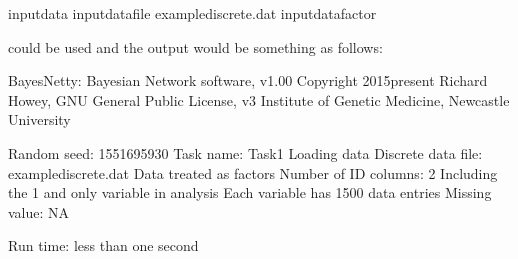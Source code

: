 \documentclass[letterpaper,10pt,english]{sphinxmanual}
\begin{document}
\begin{sphinxVerbatim}[commandchars=\\\{\}]
\PYGZhy{}input\PYGZhy{}data
\PYGZhy{}input\PYGZhy{}data\PYGZhy{}file example\PYGZhy{}discrete.dat
\PYGZhy{}input\PYGZhy{}data\PYGZhy{}factor
\end{sphinxVerbatim}

\sphinxAtStartPar
could be used and the output would be something as follows:

\begin{sphinxVerbatim}[commandchars=\\\{\}]
BayesNetty: Bayesian Network software, v1.00
\PYGZhy{}\PYGZhy{}\PYGZhy{}\PYGZhy{}\PYGZhy{}\PYGZhy{}\PYGZhy{}\PYGZhy{}\PYGZhy{}\PYGZhy{}\PYGZhy{}\PYGZhy{}\PYGZhy{}\PYGZhy{}\PYGZhy{}\PYGZhy{}\PYGZhy{}\PYGZhy{}\PYGZhy{}\PYGZhy{}\PYGZhy{}\PYGZhy{}\PYGZhy{}\PYGZhy{}\PYGZhy{}\PYGZhy{}\PYGZhy{}\PYGZhy{}\PYGZhy{}\PYGZhy{}\PYGZhy{}\PYGZhy{}\PYGZhy{}\PYGZhy{}\PYGZhy{}\PYGZhy{}\PYGZhy{}\PYGZhy{}\PYGZhy{}\PYGZhy{}\PYGZhy{}\PYGZhy{}\PYGZhy{}\PYGZhy{}\PYGZhy{}\PYGZhy{}\PYGZhy{}\PYGZhy{}\PYGZhy{}\PYGZhy{}
Copyright 2015\PYGZhy{}present Richard Howey, GNU General Public License, v3
Institute of Genetic Medicine, Newcastle University

Random seed: 1551695930
\PYGZhy{}\PYGZhy{}\PYGZhy{}\PYGZhy{}\PYGZhy{}\PYGZhy{}\PYGZhy{}\PYGZhy{}\PYGZhy{}\PYGZhy{}\PYGZhy{}\PYGZhy{}\PYGZhy{}\PYGZhy{}\PYGZhy{}\PYGZhy{}\PYGZhy{}\PYGZhy{}\PYGZhy{}\PYGZhy{}\PYGZhy{}\PYGZhy{}\PYGZhy{}\PYGZhy{}\PYGZhy{}\PYGZhy{}\PYGZhy{}\PYGZhy{}\PYGZhy{}\PYGZhy{}\PYGZhy{}\PYGZhy{}\PYGZhy{}\PYGZhy{}\PYGZhy{}\PYGZhy{}\PYGZhy{}\PYGZhy{}\PYGZhy{}\PYGZhy{}\PYGZhy{}\PYGZhy{}\PYGZhy{}\PYGZhy{}\PYGZhy{}\PYGZhy{}\PYGZhy{}\PYGZhy{}\PYGZhy{}\PYGZhy{}
Task name: Task\PYGZhy{}1
Loading data
Discrete data file: example\PYGZhy{}discrete.dat
Data treated as factors
Number of ID columns: 2
Including the 1 and only variable in analysis
Each variable has 1500 data entries
Missing value: NA
\PYGZhy{}\PYGZhy{}\PYGZhy{}\PYGZhy{}\PYGZhy{}\PYGZhy{}\PYGZhy{}\PYGZhy{}\PYGZhy{}\PYGZhy{}\PYGZhy{}\PYGZhy{}\PYGZhy{}\PYGZhy{}\PYGZhy{}\PYGZhy{}\PYGZhy{}\PYGZhy{}\PYGZhy{}\PYGZhy{}\PYGZhy{}\PYGZhy{}\PYGZhy{}\PYGZhy{}\PYGZhy{}\PYGZhy{}\PYGZhy{}\PYGZhy{}\PYGZhy{}\PYGZhy{}\PYGZhy{}\PYGZhy{}\PYGZhy{}\PYGZhy{}\PYGZhy{}\PYGZhy{}\PYGZhy{}\PYGZhy{}\PYGZhy{}\PYGZhy{}\PYGZhy{}\PYGZhy{}\PYGZhy{}\PYGZhy{}\PYGZhy{}\PYGZhy{}\PYGZhy{}\PYGZhy{}\PYGZhy{}\PYGZhy{}

Run time: less than one second
\end{sphinxVerbatim}
\end{document}
